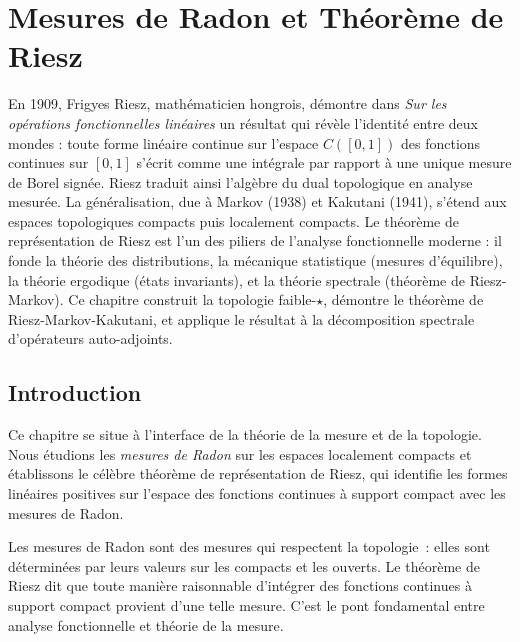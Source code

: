 \chapter{Mesures de Radon et Th\'eor\`eme de Riesz}
\label{ch:radon_riesz}

En 1909, Frigyes Riesz, mathématicien hongrois, démontre dans \emph{Sur les opérations fonctionnelles linéaires} un résultat qui révèle l'identité entre deux mondes : toute forme linéaire continue sur l'espace $C([0,1])$ des fonctions continues sur $[0,1]$ s'écrit comme une intégrale par rapport à une unique mesure de Borel signée. Riesz traduit ainsi l'algèbre du dual topologique en analyse mesurée. La généralisation, due à Markov (1938) et Kakutani (1941), s'étend aux espaces topologiques compacts puis localement compacts. Le théorème de représentation de Riesz est l'un des piliers de l'analyse fonctionnelle moderne : il fonde la théorie des distributions, la mécanique statistique (mesures d'équilibre), la théorie ergodique (états invariants), et la théorie spectrale (théorème de Riesz-Markov). Ce chapitre construit la topologie faible-$\star$, démontre le théorème de Riesz-Markov-Kakutani, et applique le résultat à la décomposition spectrale d'opérateurs auto-adjoints.

\section{Introduction}

Ce chapitre se situe \`a l'interface de la th\'eorie de la mesure et de la topologie.
Nous \'etudions les \emph{mesures de Radon} sur les espaces
localement compacts et \'etablissons le c\'el\`ebre th\'eor\`eme de repr\'esentation de
Riesz, qui identifie les formes lin\'eaires positives sur
l'espace des fonctions continues \`a support compact avec les mesures de Radon.

\begin{intuition}[title=\textbf{Lien entre topologie et mesure}]
Les mesures de Radon sont des mesures qui \og respectent \fg la topologie~: elles
sont d\'etermin\'ees par leurs valeurs sur les compacts et les ouverts. Le th\'eor\`eme
de Riesz dit que toute mani\`ere \og raisonnable \fg d'int\'egrer des fonctions continues
\`a support compact provient d'une telle mesure. C'est le pont fondamental entre
analyse fonctionnelle et th\'eorie de la mesure.
\end{intuition}

